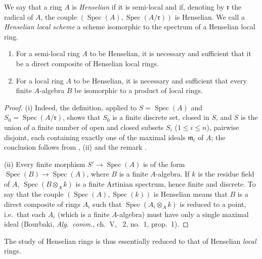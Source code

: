 \begin{definition}[18.5.8]
\label{IV.18.5.8}
We say that a ring $A$ is \emph{Henselian} if it is semi-local and if, denoting by $\mathfrak{r}$ the radical of $A$, the couple $(\operatorname{Spec}(A),\operatorname{Spec}(A/\mathfrak{r}))$ is Henselian.
We call a \emph{Henselian local scheme} a scheme isomorphic to the spectrum of a Henselian local ring.
\end{definition}

\begin{proposition}[18.5.9]
\label{IV.18.5.9}
\begin{enumerate}
  \item[(i)] For a semi-local ring $A$ to be Henselian, it is necessary and sufficient that it be a direct composite of Henselian local rings.
  \item[(ii)] For a local ring $A$ to be Henselian, it is necessary and sufficient that every finite $A$-algebra $B$ be isomorphic to a product of local rings.
\end{enumerate}
\end{proposition}

\begin{proof}
(i) Indeed, the definition, applied to $S=\operatorname{Spec}(A)$ and $S_0=\operatorname{Spec}(A/\mathfrak{r})$, shows that $S_0$ is a finite discrete set, closed in $S$, and $S$ is the union of a finite number of open and closed subsets $S_i$ ($1\leq i\leq n$), pairwise disjoint, each containing exactly one of the maximal ideals $\mathfrak{m}_i$ of $A$;
the conclusion follows from , (ii) and the remark .

(ii) Every finite morphism $S'\to\operatorname{Spec}(A)$ is of the form $\operatorname{Spec}(B)\to\operatorname{Spec}(A)$, where $B$ is a finite $A$-algebra.
If $k$ is the residue field of $A$, $\operatorname{Spec}(B\otimes_A k)$ is a finite Artinian spectrum, hence finite and discrete.
To say that the couple $(\operatorname{Spec}(A),\operatorname{Spec}(k))$ is Henselian means that $B$ is a direct composite of rings $A_i$ such that $\operatorname{Spec}(A_i\otimes_A k)$ is reduced to a point, i.e.\ that each $A_i$ (which is a finite $A$-algebra) must have only a single maximal ideal (Bourbaki, \emph{Alg.\ comm.}, ch.~V, \textsection~2, no.~1, prop.~1).
\end{proof}

The study of Henselian rings is thus essentially reduced to that of Henselian \emph{local} rings.

